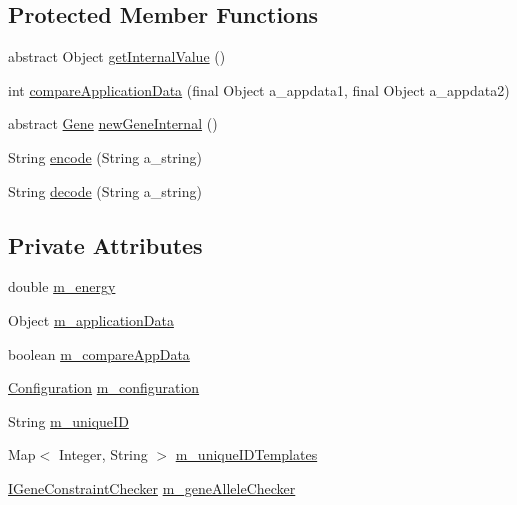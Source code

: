 \subsection*{Protected Member Functions}
\begin{DoxyCompactItemize}
\item 
abstract Object \hyperlink{classorg_1_1jgap_1_1_base_gene_ad20da6b23ba524a95caa28f727c26dcd}{get\-Internal\-Value} ()
\item 
int \hyperlink{classorg_1_1jgap_1_1_base_gene_a72fa365cdcc9f2eb399fb8346a0a511b}{compare\-Application\-Data} (final Object a\-\_\-appdata1, final Object a\-\_\-appdata2)
\item 
abstract \hyperlink{interfaceorg_1_1jgap_1_1_gene}{Gene} \hyperlink{classorg_1_1jgap_1_1_base_gene_aa423e96ffac5a9589fb3a4fbda791b3c}{new\-Gene\-Internal} ()
\item 
String \hyperlink{classorg_1_1jgap_1_1_base_gene_a5e8fc72c1fccdb665113c0c34e3fa4b5}{encode} (String a\-\_\-string)
\item 
String \hyperlink{classorg_1_1jgap_1_1_base_gene_ae9277d0b77c1e8ca244687a8ab8cf42f}{decode} (String a\-\_\-string)
\end{DoxyCompactItemize}
\subsection*{Private Attributes}
\begin{DoxyCompactItemize}
\item 
double \hyperlink{classorg_1_1jgap_1_1_base_gene_a8553da900cf30fc4b0f5463404b86a8e}{m\-\_\-energy}
\item 
Object \hyperlink{classorg_1_1jgap_1_1_base_gene_ab2e121e812be7a4dead5ca7e300ac3d7}{m\-\_\-application\-Data}
\item 
boolean \hyperlink{classorg_1_1jgap_1_1_base_gene_a27bb3cd52e8cd52fffc4953f172709a2}{m\-\_\-compare\-App\-Data}
\item 
\hyperlink{classorg_1_1jgap_1_1_configuration}{Configuration} \hyperlink{classorg_1_1jgap_1_1_base_gene_a4d41d885b45ce031c33c88214f98019e}{m\-\_\-configuration}
\item 
String \hyperlink{classorg_1_1jgap_1_1_base_gene_a8cd57f3a57f5a892f590df9e06b82e47}{m\-\_\-unique\-I\-D}
\item 
Map$<$ Integer, String $>$ \hyperlink{classorg_1_1jgap_1_1_base_gene_a3f14fef3c7107830f24306cf7bb0abf0}{m\-\_\-unique\-I\-D\-Templates}
\item 
\hyperlink{interfaceorg_1_1jgap_1_1_i_gene_constraint_checker}{I\-Gene\-Constraint\-Checker} \hyperlink{classorg_1_1jgap_1_1_base_gene_a846344a347601679d0935dcdba7f7e6f}{m\-\_\-gene\-Allele\-Checker}
\end{DoxyCompactItemize}
